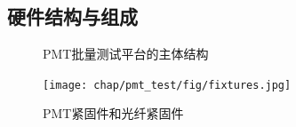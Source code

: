 \subsection{硬件结构与组成}

\begin{figure}[htbp]
	\centering
	\caption{PMT批量测试平台的主体结构}
	\label{fig:blindfigure}
\end{figure}

\begin{figure}[htbp]
	\centering
	\texttt{[image: chap/pmt\_test/fig/fixtures.jpg]}
	\caption{PMT紧固件和光纤紧固件}
	\label{fig:pmt_test:fixtures}
\end{figure}

